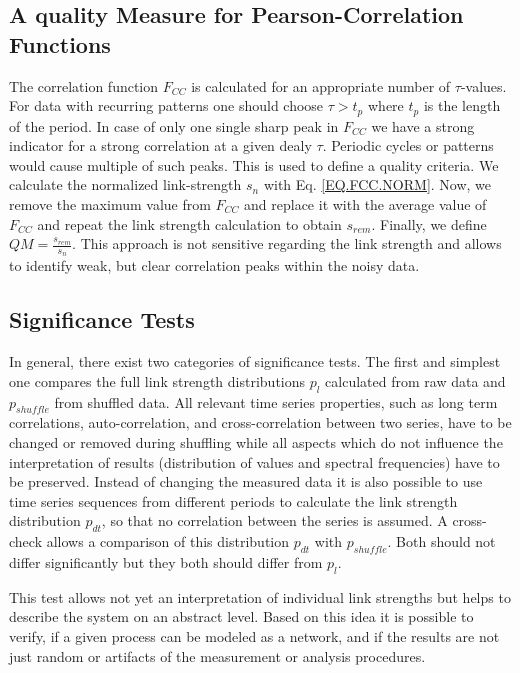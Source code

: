 \documentclass[a4paper,10pt]{scrbook}
\begin{document}
\subsection{A quality Measure for Pearson-Correlation Functions}
The correlation function $F_{CC}$ is calculated for an appropriate number of $\tau$-values. For data with recurring patterns one should choose $\tau > t_p$ where $t_p$ is the length of the period. In case of only one single sharp peak in $F_{CC}$ we have a strong indicator for a strong correlation at a given dealy $\tau$. Periodic cycles or patterns would cause multiple of such peaks. This is used to define a quality criteria. We calculate the normalized link-strength $s_n$ with Eq. 
\ref{EQ.FCC.NORM}. Now, we remove the maximum value from $F_{CC}$ and replace it with the average value of $F_{CC}$ and repeat the link strength calculation to obtain $s_{rem}$. Finally, we define $QM = \frac{s_{rem}}{s_n}$. This approach is not sensitive regarding the link strength and allows to identify weak, but clear correlation peaks within the noisy data.  

\subsection{Significance Tests}
In general, there exist two categories of significance tests. The first and simplest one compares the full link strength distributions $p_l$ calculated from raw data and $p_{shuffle}$ from shuffled data. All relevant time series properties, such as long term correlations, auto-correlation, and cross-correlation between two series, have to be changed or removed during shuffling while all aspects which do not influence the interpretation of results (distribution of values and spectral frequencies) have to be preserved. Instead of changing the measured data it is also possible to use time series sequences from different periods to calculate the link strength distribution $p_{dt}$, so that no correlation between the series is assumed. A cross-check allows a comparison of this distribution $p_{dt}$ with $p_{shuffle}$. Both should not differ significantly but they both should differ from $p_l$.

This test allows not yet an interpretation of individual link strengths but helps to describe the system on an abstract level. Based on this idea it is possible to verify, if a given process can be modeled as a network, and if the results are not just random or artifacts of the measurement or analysis procedures. 
\end{document}
